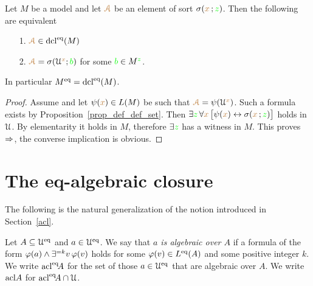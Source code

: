 \begin{proposition}\label{prop_standard_def_set}
Let $M$ be a model and let ${\color{brown}\EuScript A}$ be an element of sort $\sigma({\color{brown} x}\,;{\color{green} z})$.
Then the following are equivalent
\begin{itemize}
\item[1.]  ${\color{brown}\EuScript A}\in{\rm dcl}^{{\rm eq}}(M)$
\item[2.]  ${\color{brown}\EuScript A}=\sigma(\EuScript U^{\color{brown} x};{\color{green} b})$ for some ${\color{green} b}\in M^{\color{green} z}$.
\end{itemize}
In particular $M^{{\rm eq}}={\rm dcl}^{{\rm eq}}(M)$.
\end{proposition}

\begin{proof}
Assume  and let $\psi({\color{brown} x})\in L(M)$ be such that ${\color{brown}\EuScript A}=\psi(\EuScript U^{\color{brown} x})$.
Such a formula exists by Proposition~\ref{prop_def_def_set}.
Then $\exists{\color{green}z}\,\forall{\color{brown}x}\,\big[\psi({\color{brown} x})\leftrightarrow\sigma({\color{brown} x}\,;{\color{green} z})\big]$ holds in $\EuScript U$.
By elementarity it holds in $M$, therefore $\exists{\color{green}z}$ has a witness in $M$.
This proves $\Rightarrow$, the converse implication is obvious.
\end{proof}

\section{The eq-algebraic closure}

The following is the natural generalization of the notion introduced in Section~\ref{acl}.

\begin{definition}
  Let $A\subseteq\EuScript U^{{\rm eq}}$ and $a\in\EuScript U^{{\rm eq}}$.
  We say that \emph{$a$ is algebraic over $A$\/} if a formula of the form $\varphi(a)\wedge\exists^{=k}v\,\varphi(v)$ holds for some $\varphi(v)\in L^{{\rm eq}}(A)$ and some positive integer $k$.
  We write \emph{${\rm acl}^{{\rm eq}}\!A$\/} for the set of those $a\in\EuScript U^{{\rm eq}}$ that are algebraic over $A$.
  We write \emph{${\rm acl}A$\/} for ${\rm acl}^{{\rm eq}}\!A\cap\EuScript U$.
\end{definition}


